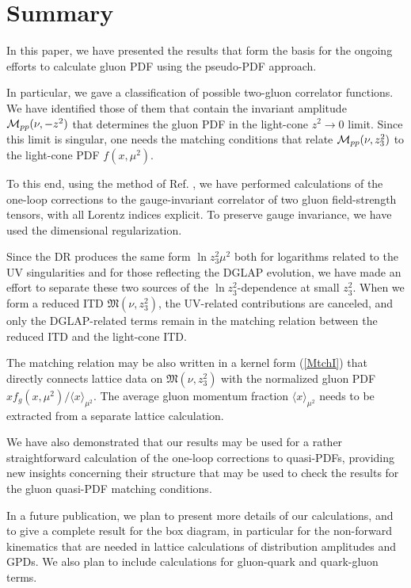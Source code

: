 \section{Summary}

In this paper, we have presented the results that form the basis for
the ongoing efforts to calculate gluon PDF using the pseudo-PDF approach.

In particular, we gave a classification of possible two-gluon correlator functions.
We have identified those of them that contain the invariant amplitude ${\cal M}_{pp}(\nu,-z^2)$
that determines the gluon PDF in the light-cone $z^2 \to 0$ limit.
Since this limit is singular, one needs the matching conditions
that relate ${\cal M}_{pp}(\nu,z_3^2)$ to the light-cone PDF $f(x,\mu^2)$.

To this end, using the method of Ref. \cite{Balitsky:1987bk}, we
have performed calculations of the one-loop corrections
to the gauge-invariant correlator of two gluon field-strength tensors,
with all Lorentz indices explicit.
To preserve gauge invariance, we have used the dimensional regularization.

Since the DR produces the same form $\ln z_3^2 \mu^2$ both for
logarithms related to the UV singularities
and for those reflecting the DGLAP evolution, we have made an effort to
separate these two sources of the \mbox{$\ln z_3^2$-dependence}
at small $z_3^2$.
When we form a reduced ITD ${\mathfrak M}(\nu,z_3^2)$, the UV-related contributions are canceled, and
only the DGLAP-related terms remain in the matching relation
between the reduced ITD and the light-cone ITD.

The matching relation may be also written in a kernel form (\ref{MtchI})
that directly connects lattice data on ${\mathfrak M}(\nu,z_3^2)$
with the normalized
gluon PDF $x f_g (x,\mu^2)/ {\langle x \rangle_{\mu^2}}$.
The average gluon momentum fraction ${\langle x \rangle_{\mu^2}}$
needs to be extracted from a separate lattice calculation.

We have also demonstrated that our results
may be used for a rather straightforward calculation
of the
one-loop corrections to quasi-PDFs,
providing new insights concerning their structure
that may be used to check the results
for the gluon quasi-PDF matching conditions.

In a future publication, we plan to present more details
of our calculations, and to give a complete result for the box diagram,
in particular for the non-forward kinematics
that are needed in lattice calculations
of distribution amplitudes and GPDs.
We also plan to include calculations for gluon-quark
and quark-gluon terms.
